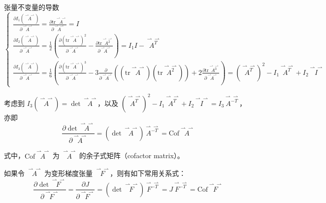 \documentclass[12pt, a4paper, oneside, UTF8]{ctexbook}  %
\newcommand{\vvec}{\overset{\rightharpoonup\!\!\!\! \rightharpoonup}}
\begin{document}
\begin{defn}
    张量不变量的导数
\[\begin{cases}
\frac{\partial I_1(\vvec{A})}{\partial \vvec{A}} = \frac{\partial \text{tr}\vvec{A}}{\partial \vvec{A}} = I \\
\frac{\partial I_2(\vvec{A})}{\partial \vvec{A}} = \frac{1}{2}\left(\frac{\partial (\text{tr}\vvec{A})^2}{\partial \vvec{A}} - \frac{\partial \text{tr}\vvec{A^2}}{\partial \vvec{A}}\right) = I_1I - \vvec{A^T} \\
\frac{\partial I_3(\vvec{A})}{\partial \vvec{A}} = \frac{1}{6}\left(\frac{\partial (\text{tr}\vvec{A})^3}{\partial \vvec{A}} - 3\frac{\partial}{\partial \vvec{A}}\left((\text{tr}\vvec{A})(\text{tr}\vvec{A^2})\right) 
+ 2\frac{\partial \text{tr}\vvec{A^3}}{\partial \vvec{A}}\right) = (\vvec{A^T})^2 - I_1\vvec{A^T} + I_2\vvec{I}
\end{cases}\]

考虑到 \( I_3(\vvec{A}) = \det \vvec{A} \)，以及 \( (\vvec{A^T})^2 - I_1\vvec{A^T} + I_2\vvec{I} = I_3\vvec{A^{-T}} \)，亦即
\[
\frac{\partial \det \vvec{A}}{\partial \vvec{A}} = (\det \vvec{A})\vvec{A^{-T}} = \text{Cof}\vvec{A}
\]

式中，\(\text{Cof}\vvec{A}\) 为 \( \vvec{A} \) 的余子式矩阵（cofactor matrix）。

如果令 \( \vvec{A} \) 为变形梯度张量 \( \vvec{F} \)，则有如下常用关系式：
\[
\frac{\partial \det \vvec{F}}{\partial \vvec{F}} = \frac{\partial J}{\partial \vvec{F}} = (\det \vvec{F})\vvec{F^{-T}} = J\vvec{F^{-T}} = \text{Cof}\vvec{F}
\]
\end{defn}
\end{document}
